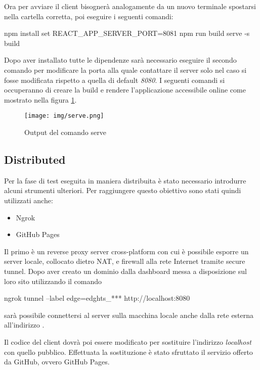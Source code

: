 Ora per avviare il client bisognerà analogamente da un nuovo terminale spostarsi nella cartella corretta, poi eseguire i seguenti comandi:

\begin{lcverbatim}
    npm install
    set REACT_APP_SERVER_PORT=8081
    npm run build
    serve -s build
\end{lcverbatim}

Dopo aver installato tutte le dipendenze sarà necessario eseguire il secondo comando per modificare la porta alla quale contattare il server solo nel caso si fosse modificata rispetto a quella di default \emph{8080}. I seguenti comandi si occuperanno di creare la build e rendere l'applicazione accessibile online come mostrato nella figura \ref{fig:serve}.

\begin{figure}[H]
\centering
\texttt{[image: img/serve.png]}
\caption{Output del comando serve}
\label{fig:serve}
\end{figure}

\subsection{Distributed}
Per la fase di test eseguita in maniera distribuita è stato necessario introdurre alcuni strumenti ulteriori. Per raggiungere questo obiettivo sono stati quindi utilizzati anche:
\begin{itemize}
    \item Ngrok\cite{ngrok}
    \item GitHub Pages\cite{gitHubreactghpages}
\end{itemize}

Il primo è un reverse proxy server cross-platform con cui è possibile esporre un server locale, collocato dietro NAT, e firewall alla rete Internet tramite secure tunnel. Dopo aver creato un dominio dalla dashboard messa a disposizione sul loro sito utilizzando il comando  
\begin{lcverbatim}
    ngrok tunnel --label edge=edghts_*** http://localhost:8080
\end{lcverbatim}
sarà possibile connettersi al server sulla macchina locale anche dalla rete esterna all'indirizzo .

Il codice del client dovrà poi essere modificato per sostituire l'indirizzo \emph{localhost} con quello pubblico. Effettuata la sostituzione è stato sfruttato il servizio offerto da GitHub, ovvero GitHub Pages.

